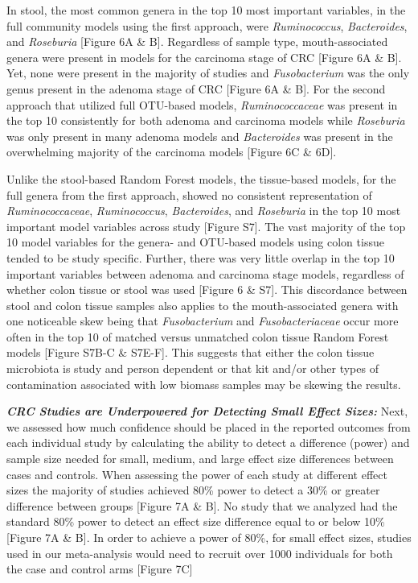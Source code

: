 \documentclass[12pt,]{article}
\begin{document}
In stool, the most common genera in the top 10 most important variables,
in the full community models using the first approach, were
\emph{Ruminococcus}, \emph{Bacteroides}, and \emph{Roseburia} {[}Figure
6A \& B{]}. Regardless of sample type, mouth-associated genera were
present in models for the carcinoma stage of CRC {[}Figure 6A \& B{]}.
Yet, none were present in the majority of studies and
\emph{Fusobacterium} was the only genus present in the adenoma stage of
CRC {[}Figure 6A \& B{]}. For the second approach that utilized full
OTU-based models, \emph{Ruminococcaceae} was present in the top 10
consistently for both adenoma and carcinoma models while
\emph{Roseburia} was only present in many adenoma models and
\emph{Bacteroides} was present in the overwhelming majority of the
carcinoma models {[}Figure 6C \& 6D{]}.

Unlike the stool-based Random Forest models, the tissue-based models,
for the full genera from the first approach, showed no consistent
representation of \emph{Ruminococcaceae}, \emph{Ruminococcus},
\emph{Bacteroides}, and \emph{Roseburia} in the top 10 most important
model variables across study {[}Figure S7{]}. The vast majority of the
top 10 model variables for the genera- and OTU-based models using colon
tissue tended to be study specific. Further, there was very little
overlap in the top 10 important variables between adenoma and carcinoma
stage models, regardless of whether colon tissue or stool was used
{[}Figure 6 \& S7{]}. This discordance between stool and colon tissue
samples also applies to the mouth-associated genera with one noticeable
skew being that \emph{Fusobacterium} and \emph{Fusobacteriaceae} occur
more often in the top 10 of matched versus unmatched colon tissue Random
Forest models {[}Figure S7B-C \& S7E-F{]}. This suggests that either the
colon tissue microbiota is study and person dependent or that kit and/or
other types of contamination associated with low biomass samples may be
skewing the results.

\textbf{\emph{CRC Studies are Underpowered for Detecting Small Effect
Sizes:}} Next, we assessed how much confidence should be placed in the
reported outcomes from each individual study by calculating the ability
to detect a difference (power) and sample size needed for small, medium,
and large effect size differences between cases and controls. When
assessing the power of each study at different effect sizes the majority
of studies achieved 80\% power to detect a 30\% or greater difference
between groups {[}Figure 7A \& B{]}. No study that we analyzed had the
standard 80\% power to detect an effect size difference equal to or
below 10\% {[}Figure 7A \& B{]}. In order to achieve a power of 80\%,
for small effect sizes, studies used in our meta-analysis would need to
recruit over 1000 individuals for both the case and control arms
{[}Figure 7C{]}
\end{document}
